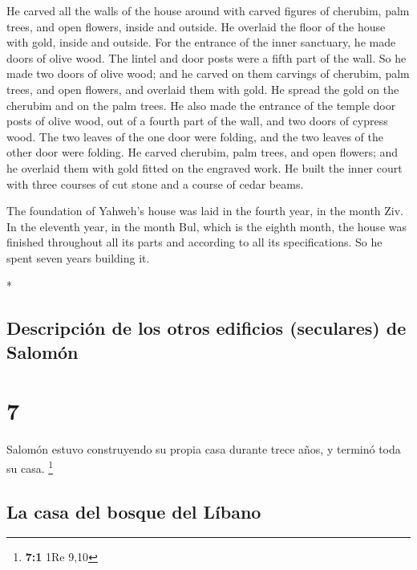 \begin{paracol}{2}
\begin{otherlanguage}{english}
 He carved all the walls of the house around with carved
figures of cherubim, palm trees, and open flowers, inside and outside.
 He overlaid the floor of the house with gold, inside and
outside.  For the entrance of the inner sanctuary, he
made doors of olive wood. The lintel and door posts were a fifth part of
the wall.  So he made two doors of olive wood; and he
carved on them carvings of cherubim, palm trees, and open flowers, and
overlaid them with gold. He spread the gold on the cherubim and on the
palm trees.  He also made the entrance of the temple door
posts of olive wood, out of a fourth part of the wall, 
and two doors of cypress wood. The two leaves of the one door were
folding, and the two leaves of the other door were folding.
 He carved cherubim, palm trees, and open flowers; and he
overlaid them with gold fitted on the engraved work.  He
built the inner court with three courses of cut stone and a course of
cedar beams.

 The foundation of Yahweh's house was laid in the fourth
year, in the month Ziv.  In the eleventh year, in the
month Bul, which is the eighth month, the house was finished throughout
all its parts and according to all its specifications. So he spent seven
years building it.

\end{otherlanguage}

\switchcolumn[0]*

\hypertarget{descripciuxf3n-de-los-otros-edificios-seculares-de-salomuxf3n}{%
\subsection{Descripción de los otros edificios (seculares) de
Salomón}\label{descripciuxf3n-de-los-otros-edificios-seculares-de-salomuxf3n}}

\hypertarget{section-12}{%
\section{7}\label{section-12}}

 Salomón estuvo construyendo su propia casa durante trece
años, y terminó toda su casa. \footnote{\textbf{7:1} 1Re 9,10}

\hypertarget{la-casa-del-bosque-del-luxedbano}{%
\subsection{La casa del bosque del
Líbano}\label{la-casa-del-bosque-del-luxedbano}}


\end{paracol}
